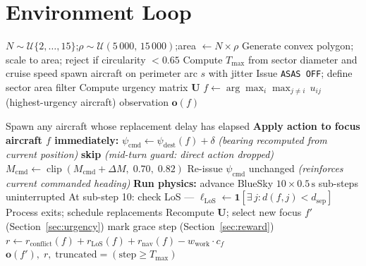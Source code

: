 \documentclass[11pt, a4paper]{article}
\begin{document}
\section{Environment Loop}
\label{sec:loop}

\begin{algorithm}[h]
\caption{\textsc{Reset} — initialise episode}
\label{alg:reset}
\begin{algorithmic}[1]
\State $N \sim \mathcal{U}\{2,\ldots,15\}$;\quad $\rho \sim \mathcal{U}(5\,000,\,15\,000)$;\quad area $\leftarrow N\times\rho$
\State Generate convex polygon; scale to area; reject if circularity $< 0.65$
\State Compute $T_\text{max}$ from sector diameter and cruise speed
 spawn aircraft on perimeter arc $s$ with jitter \EndFor
\State Issue \texttt{ASAS OFF}; define sector area filter
\State Compute urgency matrix $\mathbf{U}$
\State $f \leftarrow \arg\max_i \max_{j\neq i}\, u_{ij}$ \quad (highest-urgency aircraft)
\State \Return observation $\mathbf{o}(f)$
\end{algorithmic}
\end{algorithm}

\begin{algorithm}[h]
\caption{\textsc{Step}(action) — one RL step, 5\,s simulated}
\label{alg:step}
\begin{algorithmic}[1]
\State Spawn any aircraft whose replacement delay has elapsed
\State \textbf{Apply action to focus aircraft $f$ immediately:}
    \State $\psi_\text{cmd} \leftarrow \psi_\text{dest}(f) + \delta$ \quad\textit{(bearing recomputed from current position)}
        \State \textbf{skip} \quad\textit{(mid-turn guard: direct action dropped)}
    \EndIf
{}
    \State $M_\text{cmd} \leftarrow \operatorname{clip}(M_\text{cmd} + \Delta M,\;0.70,\;0.82)$
    \State Re-issue $\psi_\text{cmd}$ unchanged \quad\textit{(reinforces current commanded heading)}
\EndIf
\State \textbf{Run physics:} advance BlueSky $10 \times 0.5\,\text{s}$ sub-steps uninterrupted
\State At sub-step 10: check LoS — $\ell_\text{LoS} \leftarrow \mathbf{1}[\exists\,j : d(f,j) < d_\text{sep}]$
\State Process exits; schedule replacements
\State Recompute $\mathbf{U}$; select new focus $f'$ (Section~\ref{sec:urgency})
 mark grace step (Section~\ref{sec:reward}) \EndIf
\State $r \leftarrow r_\text{conflict}(f) + r_\text{LoS}(f) + r_\text{nav}(f) - w_\text{work}\cdot c_f$
\State \Return $\mathbf{o}(f'),\; r,\; \text{truncated} = (\text{step} \geq T_\text{max})$
\end{algorithmic}
\end{algorithm}
\end{document}
